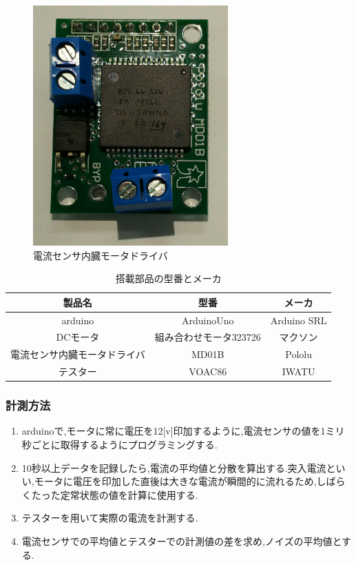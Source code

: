 \begin{figure}[H]
 \begin{center}
    \includegraphics[width=75mm]{img/currentDriver.JPG}
    \end{center}
  \caption{電流センサ内臓モータドライバ}
 \label{fig:currentDriver}
\end{figure}

\begin{table}[H]
 \begin{center}
  \caption{搭載部品の型番とメーカ}
  \begin{tabular}[htbp]{|c|c|c|}
   \hline
   製品名&型番&メーカ \\
   \hline
   arduino&ArduinoUno&Arduino SRL\\
   \hline
   DCモータ&組み合わせモータ323726&マクソン\\
   \hline
   電流センサ内臓モータドライバ&MD01B&Pololu\\
   \hline
   テスター&VOAC86&IWATU\\
   \hline
  \end{tabular}
  \label{tab:partsCurrent}
 \end{center}
\end{table}

\subsubsection{計測方法}
\begin{enumerate}
\renewcommand{\labelenumi}{\arabic{enumi}).}
\item arduinoで,モータに常に電圧を12[v]印加するように,電流センサの値を1ミリ秒ごとに取得するようにプログラミングする.
\item 10秒以上データを記録したら,電流の平均値と分散を算出する.突入電流といい,モータに電圧を印加した直後は大きな電流が瞬間的に流れるため,しばらくたった定常状態の値を計算に使用する.
\item テスターを用いて実際の電流を計測する.
\item 電流センサでの平均値とテスターでの計測値の差を求め,ノイズの平均値とする.
\end{enumerate}

